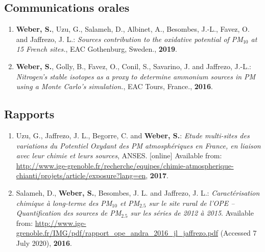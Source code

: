 \subsection{Communications orales}

\begin{enumerate}
    \item \textbf{Weber, S.}, Uzu, G., Salameh, D., Albinet, A., Besombes, J.-L., Favez,
        O. and Jaffrezo, J. L.:
        \textit{Sources contribution to the oxidative potential of PM$_{10}$ at
        15 French sites.}, EAC Gothenburg, Sweden., \textbf{2019}.
    \item \textbf{Weber, S.}, Golly, B., Favez, O., Conil, S., Savarino, J. and Jaffrezo,
        J.-L.:
        \textit{Nitrogen’s stable isotopes as a proxy to determine ammonium sources in PM
        using a Monte Carlo’s simulation.}, EAC Tours, France., \textbf{2016}.
\end{enumerate}

\subsection{Rapports}
\begin{enumerate}
    \item Uzu, G., Jaffrezo, J. L., Begorre, C. and \textbf{Weber, S.}: 
        \textit{Etude multi-sites des variations du Potentiel Oxydant des PM
        atmosphériques en France, en liaison avec leur chimie et leurs sources},
        ANSES.  [online] Available from:
        \url{http://www.ige-grenoble.fr/recherche/equipes/chimie-atmospherique-chianti/projets/article/exposure?lang=en},
        \textbf{2017}.
    \item Salameh, D., \textbf{Weber, S.}, Besombes, J. L. and Jaffrezo, J. L.:
        \textit{Caractérisation chimique à long-terme des PM$_{10}$ et PM$_{2.5}$ sur le
            site rural de l’OPE – Quantification des sources de PM$_{2.5}$ sur les séries de
        2012 à 2015}. 
        Available from:
        \url{http://www.ige-grenoble.fr/IMG/pdf/rapport_ope_andra_2016_jl_jaffrezo.pdf}
        (Accessed 7 July 2020), \textbf{2016}.
\end{enumerate}
